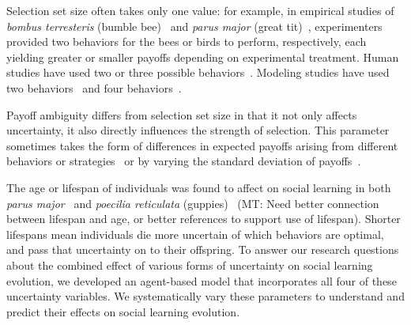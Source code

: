 \documentclass[letterpaper,11.5pt]{scrartcl}
\newcommand{\mt}[1]{{\textcolor{myorange} {({\tiny MT:} #1)}}}
\begin{document}
Selection set size often takes only one value: 
for example, in empirical studies of \emph{bombus terresteris} (bumble
bee)~\cite{Baracchi2018} and \emph{parus major} (great tit)~\cite{Aplin2017},
experimenters provided two behaviors for
the bees or birds to perform, respectively, each yielding greater or smaller
payoffs depending on experimental treatment. Human studies have used two
or three possible behaviors~\cite{McElreath2005,Toyokawa2019}.
Modeling studies have used two 
behaviors~\cite{Feldman1996,Rendell2010} and four behaviors~\cite{Enquist2007}. 

Payoff ambiguity differs from selection set size in that it not only affects uncertainty, it also directly influences the strength of selection. This parameter sometimes takes the form
of differences in expected payoffs arising from different
behaviors or strategies~\cite{Enquist2007,Rendell2010}
or by varying the standard deviation of payoffs~\cite{McElreath2005}. 

The age or lifespan of individuals was
found to affect on social learning in both \emph{parus
major}~\cite{Aplin2017} and \emph{poecilia reticulata} 
(guppies)~\cite{Leris2016} \mt{Need better connection between lifespan and 
age, or better references to support use of lifespan}.
Shorter lifespans mean individuals
die more uncertain of which behaviors are optimal, and pass that uncertainty on
to their offspring. To answer our research questions about the combined effect
of various forms of uncertainty on social learning evolution, we developed an
agent-based model that incorporates all four of
these uncertainty variables. We systematically vary these parameters
to understand and predict their effects on social learning evolution.
\end{document}
